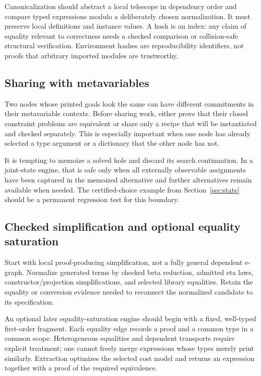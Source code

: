 \documentclass[11pt,letterpaper]{article}
\theoremstyle{definition}
\theoremstyle{remark}
\begin{document}
Canonicalization should abstract a local telescope in dependency order and compare typed expressions modulo a deliberately chosen normalization. It must preserve local definitions and instance values. A hash is an index: any claim of equality relevant to correctness needs a checked comparison or collision-safe structural verification. Environment hashes are reproducibility identifiers, not proofs that arbitrary imported modules are trustworthy.

\subsection{Sharing with metavariables}

Two nodes whose printed goals look the same can have different commitments in their metavariable contexts. Before sharing work, either prove that their closed constraint problems are equivalent or share only a recipe that will be instantiated and checked separately. This is especially important when one node has already selected a type argument or a dictionary that the other node has not.

It is tempting to memoize a solved hole and discard its search continuation. In a joint-state engine, that is safe only when all externally observable assignments have been captured in the memoized alternative and further alternatives remain available when needed. The certified-choice example from Section~\ref{sec:state} should be a permanent regression test for this boundary.

\subsection{Checked simplification and optional equality saturation}

Start with local proof-producing simplification, not a fully general dependent e-graph. Normalize generated terms by checked beta reduction, admitted eta laws, constructor/projection simplifications, and selected library equalities. Retain the equality or conversion evidence needed to reconnect the normalized candidate to its specification.

An optional later equality-saturation engine should begin with a fixed, well-typed first-order fragment. Each equality edge records a proof and a common type in a common scope. Heterogeneous equalities and dependent transports require explicit treatment; one cannot freely merge expressions whose types merely print similarly. Extraction optimizes the selected cost model and returns an expression together with a proof of the required equivalence.
\end{document}
